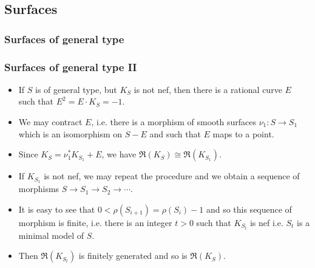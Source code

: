 \documentclass{beamer}
\theoremstyle{plain}
\theoremstyle{definition}
\theoremstyle{remark}
\def\OO{\mathcal {O}}
\begin{document}
\subsection{Surfaces}

\begin{frame}
  \frametitle{Surfaces of general type}

\end{frame}



\begin{frame}
  \frametitle{Surfaces of general type II}

\begin{itemize}\item If $S$ is of general type, but $K_S$ is not nef, then there is a rational curve $E$ such that $E^2=E\cdot K_S=-1$. 
\pause
\item We may contract $E$, i.e. there is a morphism of smooth surfaces
$\nu_1:S\to S_1$ which is an isomorphism on $S-E$ and such that $E$ maps to a point. 
\pause
\item Since $K_S=\nu_1^*K_{S_1}+E$, we have $\mathfrak{R}(K_S)\cong
\mathfrak{R}(K_{S_1})$.
\pause
\item If $K_{S_1}$ is not nef, we may repeat the procedure and we obtain a sequence of morphisms $S\to S_1\to S_2 \to \cdots$.
\pause
\item It is easy to see that $0<\rho (S_{i+1})=\rho (S_{i})-1$
and so this sequence of morphism is finite, i.e. there is an integer $t>0$ such that $K_{S_t}$ is nef i.e. $S_t$ is a minimal model of $S$.
\pause
\item Then $\mathfrak{R}(K_{S_t})$ is finitely generated and so is 
$\mathfrak{R}(K_S)$.
\end{itemize}

\end{frame}
\end{document}
